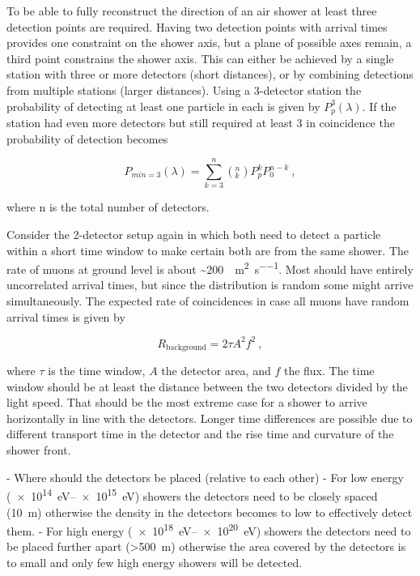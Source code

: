 To be able to fully reconstruct the direction of an air shower at least three detection points are required. Having two detection points with arrival times provides one constraint on the shower axis, but a plane of possible axes remain, a third point constrains the shower axis. This can either be achieved by a single station with three or more detectors (short distances), or by combining detections from multiple stations (larger distances). Using a 3-detector station the probability of detecting at least one particle in each is given by $P_p^3(\lambda)$. If the station had even more detectors but still required at least 3 in coincidence the probability of detection becomes

\begin{equation}
    P_{min=3}(\lambda) = \sum_{k=3}^{n} \left(^n_k\right) P_p^k P_0^{n-k} \ ,
\end{equation}

where n is the total number of detectors.

Consider the 2-detector setup again in which both need to detect a particle within a short time window to make certain both are from the same shower. The rate of muons at ground level is about \SI{~200}{\Pmump\per\meter\squared\per\second}. Most should have entirely uncorrelated arrival times, but since the distribution is random some might arrive simultaneously. The expected rate of coincidences in case all muons have random arrival times is given by

\begin{equation}
    R_{\mathrm{background}} = 2 \tau A^2 f^2 \ ,
\end{equation}

where $\tau$ is the time window, $A$ the detector area, and $f$ the flux. The time window should be at least the distance between the two detectors divided by the light speed. That should be the most extreme case for a shower to arrive horizontally in line with the detectors. Longer time differences are possible due to different transport time in the detector and the rise time and curvature of the shower front.

- Where should the detectors be placed (relative to each other)
  - For low energy (\SIrange{e14}{e15}{\eV}) showers the detectors need to be closely spaced (\SI{10}{\meter}) otherwise the density in the detectors becomes to low to effectively detect them.
  - For high energy (\SIrange{e18}{e20}{\eV}) showers the detectors need to be placed further apart (\SI{>500}{\meter}) otherwise the area covered by the detectors is to small and only few high energy showers will be detected.

